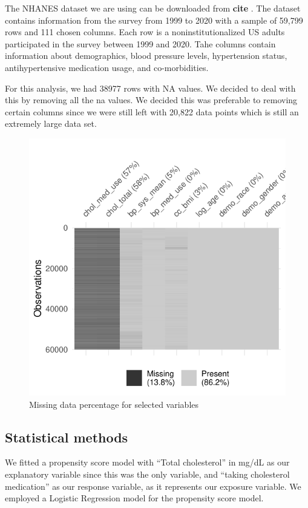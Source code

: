 \documentclass[useAMS,usenatbib,referee]{biom}
\begin{document}
The NHANES dataset we are using can be downloaded from \textbf{cite} .
The dataset contains information from the survey from 1999 to 2020 with
a sample of 59,799 rows and 111 chosen columns. Each row is a
noninstitutionalized US adults participated in the survey between 1999
and 2020. Tahe columns contain information about demographics, blood
pressure levels, hypertension status, antihypertensive medication usage,
and co-morbidities.

For this analysis, we had 38977 rows with NA values. We decided to deal
with this by removing all the na values. We decided this was preferable
to removing certain columns since we were still left with 20,822 data
points which is still an extremely large data set.

\begin{figure}
\centering
\includegraphics{final-project_files/figure-latex/fig_vizmis-1.pdf}
\caption{Missing data percentage for selected variables}
\end{figure}

\hypertarget{statistical-methods}{%
\subsection{Statistical methods}\label{statistical-methods}}

We fitted a propensity score model with ``Total cholesterol'' in mg/dL
as our explanatory variable since this was the only variable, and
``taking cholesterol medication'' as our response variable, as it
represents our exposure variable. We employed a Logistic Regression
model for the propensity score model.
\end{document}
